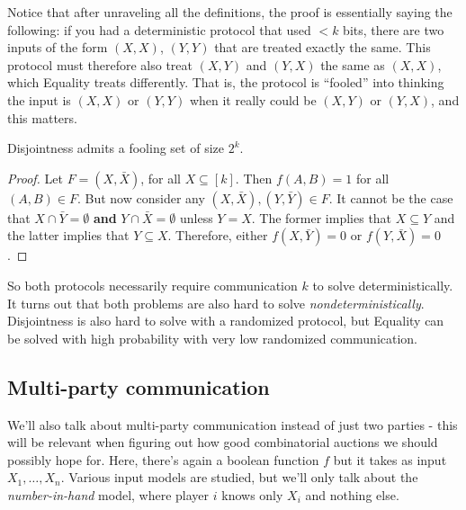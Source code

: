 Notice that after unraveling all the definitions, the proof is essentially saying the following: if you had a deterministic protocol that used $< k$ bits, there are two inputs of the form $(X, X)$, $(Y, Y)$ that are treated exactly the same. This protocol must therefore also treat $(X, Y)$ and $(Y, X)$ the same as $(X, X)$, which Equality treats differently. That is, the protocol is ``fooled'' into thinking the input is $(X, X)$ or $(Y, Y)$ when it really could be $(X, Y)$ or $(Y, X)$, and this matters.

\begin{proposition}Disjointness admits a fooling set of size $2^k$.

\end{proposition}
\begin{proof}
Let $F = (X, \bar{X})$, for all $X \subseteq [k]$. Then $f(A, B) = 1$ for all $(A, B) \in F$. But now consider any $(X, \bar{X}), (Y, \bar{Y}) \in F$. It cannot be the case that $X \cap \bar{Y} = \emptyset$ \textbf{and} $Y \cap \bar{X} = \emptyset$ unless $Y = X$. The former implies that $X \subseteq Y$ and the latter implies that $Y \subseteq X$. Therefore, either $f(X, \bar{Y}) = 0$ or $f(Y, \bar{X} ) = 0$. 
\end{proof}

So both protocols necessarily require communication $k$ to solve deterministically. It turns out that both problems are also hard to solve \emph{nondeterministically}. Disjointness is also hard to solve with a randomized protocol, but Equality can be solved with high probability with very low randomized communication. 

\subsection{Multi-party communication}
We'll also talk about multi-party communication instead of just two parties - this will be relevant when figuring out how good combinatorial auctions we should possibly hope for. Here, there's again a boolean function $f$ but it takes as input $X_1, \ldots, X_n$. Various input models are studied, but we'll only talk about the \emph{number-in-hand} model, where player $i$ knows only $X_i$ and nothing else. 

